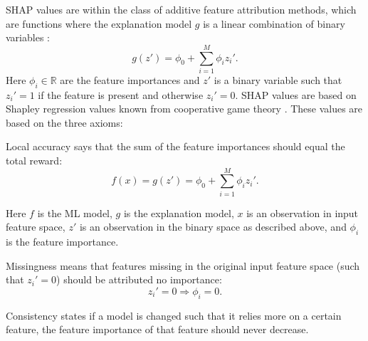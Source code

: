 SHAP values are within the class of additive feature attribution methods, which are functions where the explanation model $g$ is a linear combination of binary variables \citep{Lundberg:2017}:
\begin{equation}
  \label{eq:ml:additive_feature_attribution_method}
  g(z') = \phi_0 + \sum_{i=1}^M \phi_i z_i'.
\end{equation}
Here $\phi_i \in \mathbb{R}$ are the feature importances and $z'$ is a binary variable such that $z_i'=1$ if the feature is present and otherwise $z_i' = 0$. SHAP values are based on Shapley regression values known from cooperative game theory \autocite{Shapley1953}. These values are based on the three axioms:
\begin{axiom}
  Local accuracy says that the sum of the feature importances should equal the total reward:
  \begin{equation}
    f(x) = g(z') = \phi_0 + \sum_{i=1}^M \phi_i z_i'.
  \end{equation}
\end{axiom}
Here $f$ is the ML model, $g$ is the explanation model, $x$ is an observation in input feature space, $z'$ is an observation in the binary space as described above, and $\phi_i$ is the feature importance. 
\begin{axiom}[Missingness]
  Missingness means that features missing in the original input feature space (such that $z_i'=0$) should be attributed no importance:
  \begin{equation}
    z_i' = 0 \Rightarrow \phi_i = 0.
  \end{equation} 
\end{axiom}
\begin{axiom}[Consistency]
  \label{axiom:ml:shap_consistency}
  Consistency states if a model is changed such that it relies more on a certain feature, the feature importance of that feature should never decrease. 
\end{axiom}

